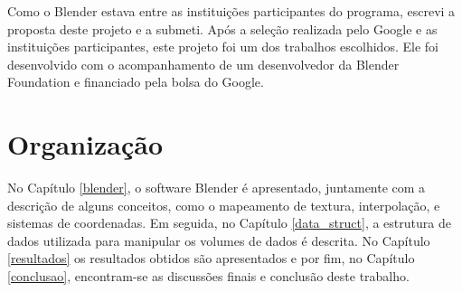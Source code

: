 Como o Blender estava entre as instituições participantes do programa, escrevi a proposta deste projeto e a submeti. Após a seleção realizada pelo Google e as instituições participantes, este projeto foi um dos trabalhos escolhidos. Ele foi desenvolvido com o acompanhamento de um desenvolvedor da Blender Foundation e financiado pela bolsa do Google.

\section{Organizaç\~ao}

No Capítulo \ref{blender}, o software Blender é apresentado, juntamente com a descrição de alguns conceitos, como o mapeamento de textura, interpolação, e sistemas de coordenadas. Em seguida, no Capítulo \ref{data_struct}, a estrutura de dados utilizada para manipular os volumes de dados é descrita. No Capítulo \ref{resultados} os resultados obtidos são apresentados e por fim, no Capítulo \ref{conclusao}, encontram-se as discussões finais e conclusão deste trabalho.
